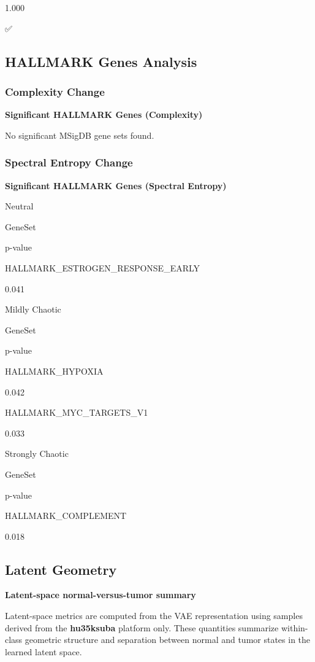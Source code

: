 \documentclass[
  letterpaper,
  DIV=11,
  numbers=noendperiod,
  openany,
  oneside]{scrreprt}
\begin{document}
1.000

✅

\subsection{HALLMARK Genes Analysis}

\subsubsection{Complexity Change}

\textbf{Significant HALLMARK Genes (Complexity)}

No significant MSigDB gene sets found.

\subsubsection{Spectral Entropy Change}

\textbf{Significant HALLMARK Genes (Spectral Entropy)}

Neutral

GeneSet

p-value

HALLMARK\_ESTROGEN\_RESPONSE\_EARLY

0.041

Mildly Chaotic

GeneSet

p-value

HALLMARK\_HYPOXIA

0.042

HALLMARK\_MYC\_TARGETS\_V1

0.033

Strongly Chaotic

GeneSet

p-value

HALLMARK\_COMPLEMENT

0.018

\subsection{Latent Geometry}

\textbf{Latent-space normal-versus-tumor summary}

Latent-space metrics are computed from the VAE representation using
samples derived from the \textbf{hu35ksuba} platform only. These
quantities summarize within-class geometric structure and separation
between normal and tumor states in the learned latent space.
\end{document}

